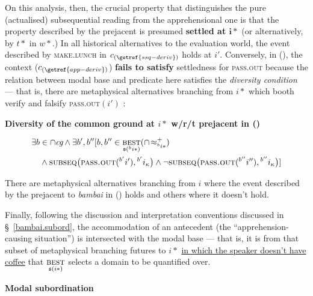 On this analysis, then, the crucial property that distinguishes the pure (actualised) subsequential reading from the apprehensional one is that the property described by the prejacent is presumed \textbf{settled at $ \boldsymbol{i*}$} (or alternatively, by $ t* $ in $ w* $.) In all historical alternatives to the evaluation world, the event described by \textsc{make.lunch} in $ c_{(\getref{ssq-deriv})}$ holds at $ i' $. Conversely, in (), the context ($ c_{(\getref{app-deriv})} $) \textbf{fails to satisfy} settledness for \textsc{pass.out} because the relation between modal base and predicate here satisfies the \textit{diversity condition} --- that is, there are metaphysical alternatives branching from $ i* $ which booth verify and falsify \textsc{pass.out}$ (i') $ \citep[\textit{cf.}][83]{Condoravdi2002}:

\pex \textbf{Diversity of the common ground at $ i* $ w/r/t prejacent in ()}


$$ \begin{multlined}\exists b\in\cap\textit{cg}\wedge\exists b',b''[b,b''\in\underset{\mathfrak s(^bi*)}{\textsc{best}}(\cap\!\approx^+_{^bi*})\\\wedge\textsc{subseq}\big(\textsc{pass.out}(^{b'}i'),{}^{b'}i_\kappa\big)\wedge\neg\textsc{subseq}\big(\textsc{pass.out}(^{b''}i''),{}^{b''}i_\kappa\big)]\end{multlined}$$ 

There are metaphysical alternatives branching from $ i $ where the event described by the prejacent to \textit{bambai} in () holds and others where it doesn't hold.
\xe

\noindent Finally, following the discussion and interpretation conventions discussed in \S~\ref{bambai.subord}, the accommodation of an antecedent (the ``apprehension-causing situation'') is intersected with the modal base --- that is, it is from that subset of metaphysical branching futures to $ i* $ \ul{in which the speaker doesn't have coffee} that $ \underset{\mathfrak s(i*)}{\textsc{best}} $ selects a domain to be quantified over.%

\pex[exno=\getref{app-deriv}]\a[label=f]\textbf{Modal subordination}


